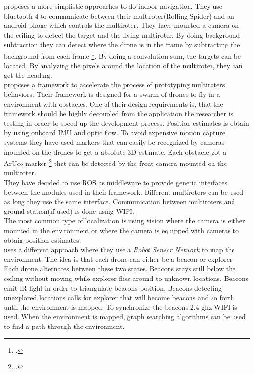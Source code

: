  
\cite{kang2015indoor} proposes a more simplistic approaches to do indoor navigation.
They use bluetooth 4 to communicate between their multiroter(Rolling Spider) and an android phone which controls the multiroter.
They have mounted a camera on the ceiling to detect the target and the flying multiroter.
By doing background subtraction they can detect where the drone is in the frame by subtracting the background from each frame \footcite{wikiBackgroundsubtraction}. 
By doing a convolution sum, the targets can be located. By analyzing the pixels around the location of the multiroter, they can get the heading. \\

\cite{sanchez2014system} proposes a framework to accelerate the process of prototyping multiroters behaviors. Their framework is designed for a swarm of drones to fly in a environment with obstacles. One of their design requirements is, that the framework should be highly decoupled from the application the researcher is testing in order to speed up the development process. 
Position estimates is obtain by using onboard IMU and optic flow. To avoid expensive motion capture systems they have used markers that can easily be recognized by cameras mounted on the drones to get a absolute 3D estimate. Each obstacle got a ArUco-marker \footcite{Aruco2014} that can be detected by the front camera mounted on the multiroter. \\
They have decided to use ROS as middleware to provide generic interfaces between the modules used in their framework. Different multiroters can be used as long they use the same interface. Communication between multiroters and ground station(if used) is done using WIFI. \\


The most common type of localization is using vision where the camera is either mounted in the environment or where the camera is equipped with cameras to obtain position estimates.\\
\cite{stirling2012indoor} uses a different approach where they use a \textit{Robot Sensor Network} to map the environment.
The idea is that each drone can either be a beacon or explorer. Each drone alternates between these two states. Beacons stays still below the ceiling without moving while explorer flies around to unknown locations. Beacons emit IR light in order to triangulate beacons position.  Beacons detecting unexplored locations calls for explorer that will become beacons and so forth until the environment is mapped. To synchronize the beacons 2.4 ghz WIFI is used. When the environment is mapped, graph searching algorithms can be used to find a path through the environment.
